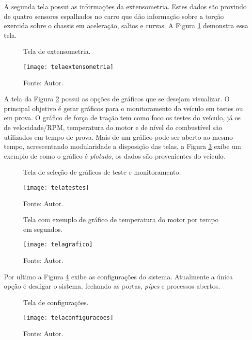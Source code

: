 A segunda tela possui as informações da extensometria. Estes dados são provindo de quatro sensores espalhados no carro que dão informação sobre a torção exercida sobre o chassis em aceleração, saltos e curvas. A Figura \ref{fig:telaextensometria} demonstra essa tela.

\begin{figure}[!htb]
	\centering
		\caption{Tela de extensometria.}
		\texttt{[image: telaextensometria]} 
		\caption*{Fonte: Autor.}
		\label{fig:telaextensometria}
\end{figure}    

A tela da Figura \ref{fig:telatestes} possui as opções de gráficos que se desejam visualizar. O principal objetivo é gerar gráficos para o monitoramento do veículo em testes ou em prova. O gráfico de força de tração tem como foco os testes do veículo, já os de velocidade/RPM, temperatura do motor e de nível do combustível são utilizados em tempo de prova. Mais de um gráfico pode ser aberto ao mesmo tempo, acrescentando modularidade a disposição das telas, a Figura \ref{fig:telagrafico} exibe um exemplo de como o gráfico é \textit{plotado}, os dados são provenientes do veículo.

\begin{figure}[!htb]
	\centering
		\caption{Tela de seleção de gráficos de teste e monitoramento.}
		\texttt{[image: telatestes]} 
		\caption*{Fonte: Autor.}
		\label{fig:telatestes}
\end{figure}    

\begin{figure}[!htb]
	\centering
		\caption{Tela com exemplo de gráfico de temperatura do motor por tempo em segundos.}
		\texttt{[image: telagrafico]} 
		\caption*{Fonte: Autor.}
		\label{fig:telagrafico}
\end{figure}    

Por ultimo a Figura \ref{fig:telaconfiguracao} exibe as configurações do sistema. Atualmente a única opção é desligar o sistema, fechando as portas, \textit{pipes} e processos abertos. 


\begin{figure}[!htb]
	\centering
		\caption{Tela de configurações.}
		\texttt{[image: telaconfiguracoes]} 
		\caption*{Fonte: Autor.}
		\label{fig:telaconfiguracao}
\end{figure}    

